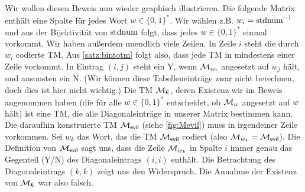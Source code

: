 Wir wollen diesen Beweis nun wieder graphisch illustrieren.
Die folgende Matrix enthält eine Spalte für jedes Wort $w\in\{0,1\}^*$.
Wir wählen z.B. $w_i=\operatorname{stdnum}^{-1}$ und aus der Bijektivität von $\operatorname{stdnum}$ folgt, dass jedes $w\in\{0,1\}^*$ einmal vorkommt.
Wir haben außerdem unendlich viele Zeilen.
In Zeile $i$ steht die durch $w_i$ codierte \ac{TM}.
Aus \autoref{satz:bintotm} folgt also, dass jede \ac{TM} in mindestens einer Zeile vorkommt.
In Eintrag $(i,j)$ steht ein Y, wenn $\mathcal{M}_{w_i}$ angesetzt auf $w_j$ hält, und ansonsten ein N. %
(Wir können diese Tabelleneinträge zwar nicht berechnen, doch dies ist hier nicht wichtig.)
Die \ac{TM} $\mathcal{M}_\text{€}$, deren Existenz wir im Beweis angenommen haben (die für alle $w\in\{0,1\}^*$ entscheidet, ob $\mathcal{M}_w$ angesetzt auf $w$ hält) ist eine \ac{TM}, die alle Diagonaleinträge in unserer Matrix bestimmen kann.
Die daraufhin konstruierte \ac{TM} $\mathcal{M}_\textsf{evil}$ (siehe \autoref{fig:Mevil}) muss in irgendeiner Zeile vorkommen.
Sei $w_k$ das Wort, das die \ac{TM} $\mathcal{M}_\textsf{evil}$ codiert (also $\mathcal{M}_{w_k} = \mathcal{M}_\textsf{evil}$).
Die Definition von $\mathcal{M}_\textsf{evil}$ sagt uns, dass die Zeile $\mathcal{M}_{w_k}$ in Spalte $i$ immer genau das Gegenteil (Y/N) des Diagonaleintrags $(i,i)$ enthält. Die Betrachtung des Diagonaleintrags $(k,k)$ zeigt uns den Widerspruch.
Die Annahme der Existenz von $\mathcal{M}_\text{€}$ war also falsch. 

